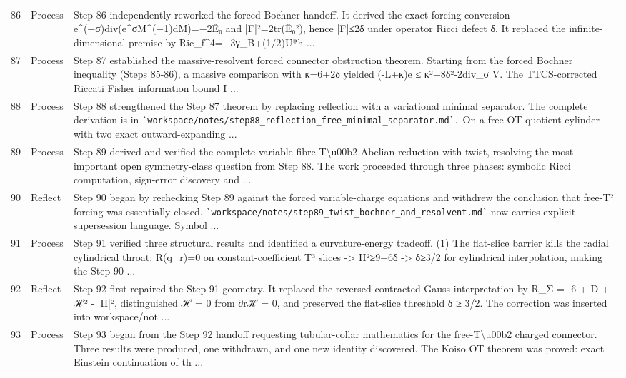 \documentclass[UTF8,fontset=fandol,zihao=-4]{ctexart}
\begin{document}
\begin{longtable}{r p{} >{\raggedright\arraybackslash}p{}}
86 & Process & Step 86 independently reworked the forced Bochner handoff. It derived the exact forcing conversion e\textasciicircum{}(−σ)div(e\textasciicircum{}σM\textasciicircum{}(−1)dM)=−2Ê₀ and |F|²=2tr(Ê₀²), hence |F|≤2δ under operator Ricci defect δ. It replaced the infinite-dimensional premise by Ric\_f\textasciicircum{}4=−3γ\_B+(1/2)U*h ...\\
87 & Process & Step 87 established the massive-resolvent forced connector obstruction theorem. Starting from the forced Bochner inequality (Steps 85-86), a massive comparison with κ=6+2δ yielded (-L+κ)e ≤ κ²+8δ²-2div\_σ V. The TTCS-corrected Riccati Fisher information bound I ...\\
88 & Process & Step 88 strengthened the Step 87 theorem by replacing reflection with a variational minimal separator. The complete derivation is in \nolinkurl{`workspace/notes/step88_reflection_free_minimal_separator.md`.} On a free-OT quotient cylinder with two exact outward-expanding  ...\\
89 & Process & Step 89 derived and verified the complete variable-fibre T\textbackslash{}u00b2 Abelian reduction with twist, resolving the most important open symmetry-class question from Step 88. The work proceeded through three phases: symbolic Ricci computation, sign-error discovery and ...\\
90 & Reflect & Step 90 began by rechecking Step 89 against the forced variable-charge equations and withdrew the conclusion that free-T² forcing was essentially closed. \nolinkurl{`workspace/notes/step89_twist_bochner_and_resolvent.md`} now carries explicit supersession language. Symbol ...\\
91 & Process & Step 91 verified three structural results and identified a curvature-energy tradeoff. (1) The flat-slice barrier kills the radial cylindrical throat: R(q\_r)=0 on constant-coefficient T³ slices  ->  H²≥9−6δ  ->  δ≥3/2 for cylindrical interpolation, making the Step 90 ...\\
92 & Reflect & Step 92 first repaired the Step 91 geometry. It replaced the reversed contracted-Gauss interpretation by R\_Σ = -6 + D + ℋ² - |II|², distinguished ℋ = 0 from ∂rℋ = 0, and preserved the flat-slice threshold δ ≥ 3/2. The correction was inserted into workspace/not ...\\
93 & Process & Step 93 began from the Step 92 handoff requesting tubular-collar mathematics for the free-T\textbackslash{}u00b2 charged connector. Three results were produced, one withdrawn, and one new identity discovered. The Koiso OT theorem was proved: exact Einstein continuation of th ...\\

\end{longtable}
\end{document}
